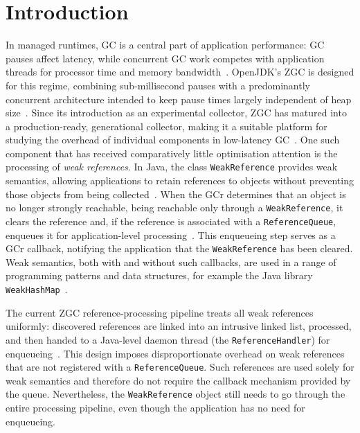 \chapter{Introduction}
\label{chap:introduction}

    In managed runtimes, \ac{GC} is a central part of application performance: \ac{GC} pauses affect latency, while concurrent \ac{GC} work competes with application threads for processor time and memory bandwidth~\cite{oracle-gc-collectors,oracle-gc-implementation}. OpenJDK's \ac{ZGC} is designed for this regime, combining sub-millisecond pauses with a predominantly concurrent architecture intended to keep pause times largely independent of heap size~\cite{jep333-zgc,jep439-genzgc,osterlund23-genzgc-beyond}. Since its introduction as an experimental collector, \ac{ZGC} has matured into a production-ready, generational collector, making it a suitable platform for studying the overhead of individual components in low-latency \ac{GC}~\cite{jep377-zgc-prod,jep439-genzgc}. One such component that has received comparatively little optimisation attention is the processing of \emph{weak references}. In Java, the class \texttt{WeakReference} provides weak semantics, allowing applications to retain references to objects without preventing those objects from being collected~\cite{oracle-ref-javadoc,openjdk-weakreference-java}. When the \ac{GCr} determines that an object is no longer strongly reachable, being reachable only through a \texttt{WeakReference}, it clears the reference and, if the reference is associated with a \texttt{ReferenceQueue}, enqueues it for application-level processing~\cite{openjdk-reference-java,openjdk-referencequeue-java}. This enqueueing step serves as a \ac{GCr} callback, notifying the application that the \texttt{WeakReference} has been cleared. Weak semantics, both with and without such callbacks, are used in a range of programming patterns and data structures, for example the Java library \texttt{WeakHashMap}~\cite{openjdk-weakhashmap-java}.

    The current \ac{ZGC} reference-processing pipeline treats all weak references uniformly: discovered references are linked into an intrusive linked list, processed, and then handed to a Java-level daemon thread (the \texttt{ReferenceHandler}) for enqueueing~\cite{openjdk-zreferenceprocessor-cpp,openjdk-reference-java}. This design imposes disproportionate overhead on weak references that are not registered with a \texttt{ReferenceQueue}. Such references are used solely for weak semantics and therefore do not require the callback mechanism provided by the queue. Nevertheless, the \texttt{WeakReference} object still needs to go through the entire processing pipeline, even though the application has no need for enqueueing.

